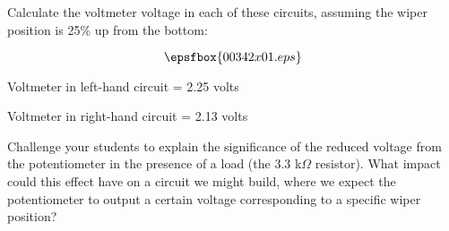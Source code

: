 

Calculate the voltmeter voltage in each of these circuits, assuming the wiper position is 25\% up from the bottom:

$$\epsfbox{00342x01.eps}$$







Voltmeter in left-hand circuit = 2.25 volts

Voltmeter in right-hand circuit = 2.13 volts







Challenge your students to explain the significance of the reduced voltage from the potentiometer in the presence of a load (the 3.3 k$\Omega$ resistor).  What impact could this effect have on a circuit we might build, where we expect the potentiometer to output a certain voltage corresponding to a specific wiper position?




